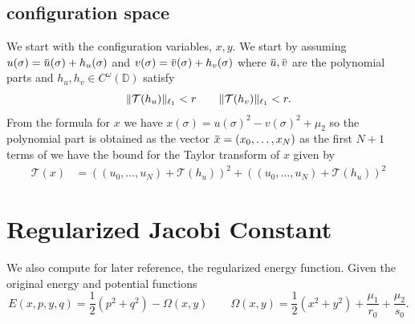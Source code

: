 \documentclass[10pt]{article}
\newcommand{\dd}{\mathbb{D}}
\newcommand{\cT}{\mathcal{T}}
\newcommand{\overbar}[1]{\mkern 1.5mu\overline{\mkern-1.5mu#1\mkern-1.5mu}\mkern 1.5mu}
\DeclarePairedDelimiter{\norm}{\lVert}{\rVert}
\begin{document}
\subsection{configuration space} 
We start with the configuration variables, $x,y$. We start by assuming $u(\sigma) = \overbar{u}(\sigma) + h_u(\sigma)$ and $v(\sigma) = \overbar{v}(\sigma) + h_v(\sigma)$ where $\overbar{u}, \overbar{v}$ are the polynomial parts and $h_u,h_v \in C^\omega(\dd)$ satisfy 
\[
\norm{\cT(h_u)}_{\ell_1} < r \qquad \norm{\cT (h_v)}_{\ell_1} < r. 
\]
From the formula for $x$ we have $x(\sigma) = u(\sigma)^2 - v(\sigma)^2 + \mu_2$ so the polynomial part is obtained as the vector $\overbar{x} = (x_0,\dots,x_N)$ as the first $N+1$ terms of  we have the bound for the Taylor transform of $x$ given by 
\begin{align*}
	\cT(x) & = \left( (u_0,\dots,u_N) + \cT(h_u) \right)^2 + \left( (u_0,\dots,u_N) + \cT(h_u) \right)^2 
\end{align*} 

\section{Regularized Jacobi Constant}
We also compute for later reference, the regularized energy function. Given the original energy and potential functions
\[
E(x,p,y,q) = \frac{1}{2}(p^2 +q^2) - \Omega(x,y) \qquad \Omega(x,y) = \frac{1}{2}(x^2 + y^2) + \frac{\mu_1}{r_0} + \frac{\mu_2}{s_0}.
\]
\end{document}
